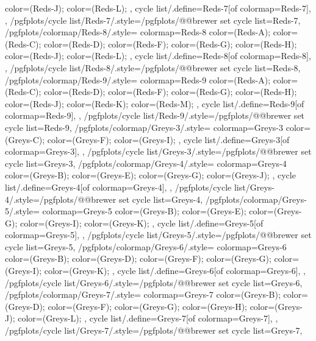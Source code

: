 {{{      color=(Reds-J);
      color=(Reds-L);
    },
    cycle list/.define={Reds-7}{[of colormap=Reds-7]},
  },
  /pgfplots/cycle list/Reds-7/.style={/pgfplots/@@brewer set cycle list={Reds-7}},
  /pgfplots/colormap/Reds-8/.style={
    colormap={Reds-8}{
      color=(Reds-A);
      color=(Reds-C);
      color=(Reds-D);
      color=(Reds-F);
      color=(Reds-G);
      color=(Reds-H);
      color=(Reds-J);
      color=(Reds-L);
    },
    cycle list/.define={Reds-8}{[of colormap=Reds-8]},
  },
  /pgfplots/cycle list/Reds-8/.style={/pgfplots/@@brewer set cycle list={Reds-8}},
  /pgfplots/colormap/Reds-9/.style={
    colormap={Reds-9}{
      color=(Reds-A);
      color=(Reds-C);
      color=(Reds-D);
      color=(Reds-F);
      color=(Reds-G);
      color=(Reds-H);
      color=(Reds-J);
      color=(Reds-K);
      color=(Reds-M);
    },
    cycle list/.define={Reds-9}{[of colormap=Reds-9]},
  },
  /pgfplots/cycle list/Reds-9/.style={/pgfplots/@@brewer set cycle list={Reds-9}},
  /pgfplots/colormap/Greys-3/.style={
    colormap={Greys-3}{
      color=(Greys-C);
      color=(Greys-F);
      color=(Greys-I);
    },
    cycle list/.define={Greys-3}{[of colormap=Greys-3]},
  },
  /pgfplots/cycle list/Greys-3/.style={/pgfplots/@@brewer set cycle list={Greys-3}},
  /pgfplots/colormap/Greys-4/.style={
    colormap={Greys-4}{
      color=(Greys-B);
      color=(Greys-E);
      color=(Greys-G);
      color=(Greys-J);
    },
    cycle list/.define={Greys-4}{[of colormap=Greys-4]},
  },
  /pgfplots/cycle list/Greys-4/.style={/pgfplots/@@brewer set cycle list={Greys-4}},
  /pgfplots/colormap/Greys-5/.style={
    colormap={Greys-5}{
      color=(Greys-B);
      color=(Greys-E);
      color=(Greys-G);
      color=(Greys-I);
      color=(Greys-K);
    },
    cycle list/.define={Greys-5}{[of colormap=Greys-5]},
  },
  /pgfplots/cycle list/Greys-5/.style={/pgfplots/@@brewer set cycle list={Greys-5}},
  /pgfplots/colormap/Greys-6/.style={
    colormap={Greys-6}{
      color=(Greys-B);
      color=(Greys-D);
      color=(Greys-F);
      color=(Greys-G);
      color=(Greys-I);
      color=(Greys-K);
    },
    cycle list/.define={Greys-6}{[of colormap=Greys-6]},
  },
  /pgfplots/cycle list/Greys-6/.style={/pgfplots/@@brewer set cycle list={Greys-6}},
  /pgfplots/colormap/Greys-7/.style={
    colormap={Greys-7}{
      color=(Greys-B);
      color=(Greys-D);
      color=(Greys-F);
      color=(Greys-G);
      color=(Greys-H);
      color=(Greys-J);
      color=(Greys-L);
    },
    cycle list/.define={Greys-7}{[of colormap=Greys-7]},
  },
  /pgfplots/cycle list/Greys-7/.style={/pgfplots/@@brewer set cycle list={Greys-7}},
}
